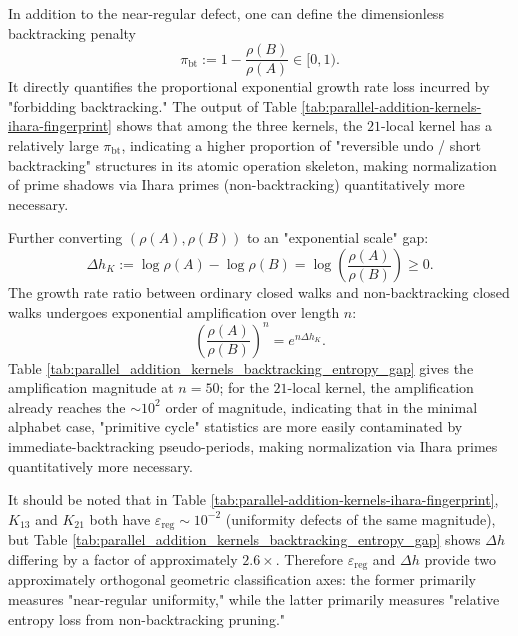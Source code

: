 \begin{remark}\label{rem:ihara-pi-bt}
In addition to the near-regular defect, one can define the dimensionless backtracking penalty
$$
\pi_{\mathrm{bt}}:=1-\frac{\rho(B)}{\rho(A)}\in[0,1).
$$
It directly quantifies the proportional exponential growth rate loss incurred by "forbidding backtracking." The output of Table \ref{tab:parallel-addition-kernels-ihara-fingerprint} shows that among the three kernels, the \(21\)-local kernel has a relatively large \(\pi_{\mathrm{bt}}\), indicating a higher proportion of "reversible undo / short backtracking" structures in its atomic operation skeleton, making normalization of prime shadows via Ihara primes (non-backtracking) quantitatively more necessary.
\end{remark}

\begin{remark}\label{rem:ihara-entropy-gap}
Further converting \((\rho(A),\rho(B))\) to an "exponential scale" gap:
\[
\Delta h_K:=\log\rho(A)-\log\rho(B)=\log\!\left(\frac{\rho(A)}{\rho(B)}\right)\ge 0.
\]
The growth rate ratio between ordinary closed walks and non-backtracking closed walks undergoes exponential amplification over length \(n\):
\[
\left(\frac{\rho(A)}{\rho(B)}\right)^n=e^{n\Delta h_K}.
\]
Table \ref{tab:parallel_addition_kernels_backtracking_entropy_gap} gives the amplification magnitude at \(n=50\); for the \(21\)-local kernel, the amplification already reaches the \(\sim 10^2\) order of magnitude, indicating that in the minimal alphabet case, "primitive cycle" statistics are more easily contaminated by immediate-backtracking pseudo-periods, making normalization via Ihara primes quantitatively more necessary.


It should be noted that in Table \ref{tab:parallel-addition-kernels-ihara-fingerprint}, \(K_{13}\) and \(K_{21}\) both have \(\varepsilon_{\mathrm{reg}}\sim 10^{-2}\) (uniformity defects of the same magnitude), but Table \ref{tab:parallel_addition_kernels_backtracking_entropy_gap} shows \(\Delta h\) differing by a factor of approximately \(2.6\times\). Therefore \(\varepsilon_{\mathrm{reg}}\) and \(\Delta h\) provide two approximately orthogonal geometric classification axes: the former primarily measures "near-regular uniformity," while the latter primarily measures "relative entropy loss from non-backtracking pruning."
\end{remark}

